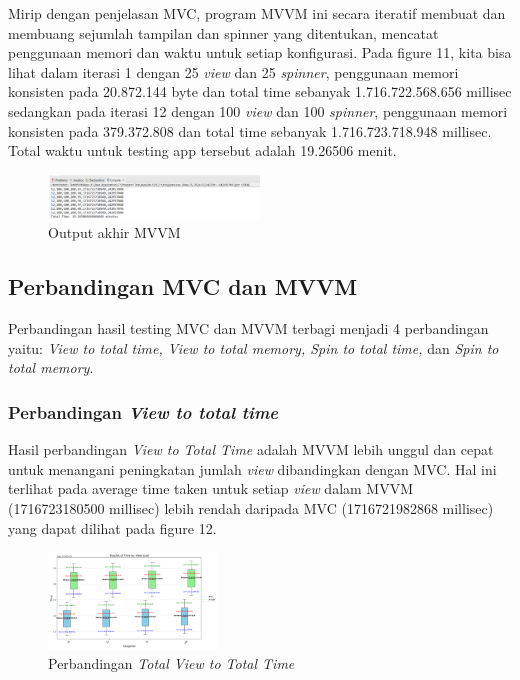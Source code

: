 \documentclass[conference]{IEEEtran}
\begin{document}
	Mirip dengan penjelasan MVC, program MVVM ini secara iteratif membuat dan membuang sejumlah tampilan dan spinner yang ditentukan, mencatat penggunaan memori dan waktu untuk setiap konfigurasi.  Pada figure 11, kita bisa lihat dalam iterasi 1 dengan 25 \textit{view} dan 25 \textit{spinner}, penggunaan memori konsisten pada 20.872.144 byte dan total time sebanyak 1.716.722.568.656 millisec sedangkan pada iterasi 12 dengan 100 \textit{view} dan 100 \textit{spinner}, penggunaan memori konsisten pada 379.372.808 dan total time sebanyak 1.716.723.718.948 millisec. Total waktu untuk testing app tersebut adalah 19.26506 menit.
	
	\begin{figure}[h]
		\centering
		\includegraphics[width=0.5\textwidth]{images/ENDMVVM}
		\caption{Output akhir MVVM}
		\label{fig:end_mvvm}
	\end{figure}
	
	\subsection{Perbandingan MVC dan MVVM}
	Perbandingan hasil testing MVC dan MVVM terbagi menjadi 4 perbandingan yaitu: \textit{View to total time, View to total memory, Spin to total time,} dan \textit{Spin to total memory}.
	\subsubsection{Perbandingan \textit{View to total time}}
	Hasil perbandingan \textit{View to Total Time} adalah MVVM lebih unggul dan cepat untuk menangani peningkatan jumlah \textit{view} dibandingkan dengan MVC. Hal ini terlihat pada average time taken untuk setiap \textit{view} dalam MVVM (1716723180500 millisec) lebih rendah daripada MVC (1716721982868 millisec) yang dapat dilihat pada figure 12.
	
	\begin{figure}[h]
		\centering
		\includegraphics[width=0.4\textwidth]{../mvc-mvvm/plot_view_total_time.pdf}
		\caption{Perbandingan \textit{Total View to Total Time}}
		\label{fig:total_view_to_total_time}
	\end{figure}
	
\end{document}
